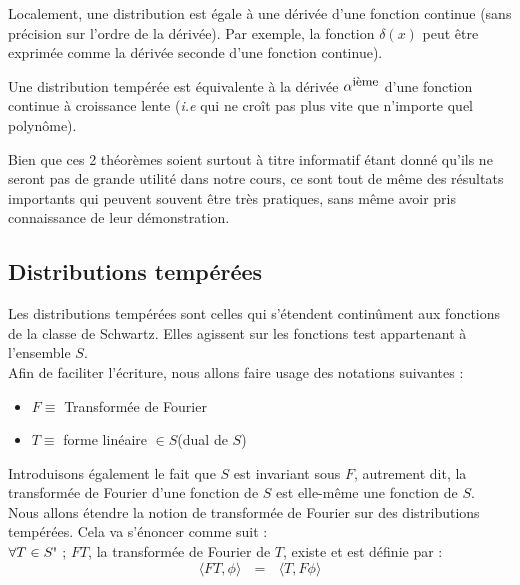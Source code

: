 \documentclass[../notesdecours.tex]{subfiles}
\begin{document}
\begin{theorem}
    Localement, une distribution est égale à une dérivée d'une fonction continue (sans précision sur l'ordre de la dérivée). Par exemple, la fonction $\delta(x)$ peut être exprimée comme la dérivée seconde d'une fonction continue).
\end{theorem}
\begin{theorem}
    Une distribution tempérée est équivalente à la dérivée $\alpha^{\mbox{\small{ième}}}$ d'une fonction continue à croissance lente (\textit{i.e} qui ne croît pas plus vite que n'importe quel polynôme).
\end{theorem}
Bien que ces 2 théorèmes soient surtout à titre informatif étant donné qu'ils ne seront pas de grande utilité dans notre cours, ce sont tout de même des résultats importants qui peuvent souvent être très pratiques, 
sans même avoir pris connaissance de leur démonstration.

\subsection{Distributions tempérées}
Les distributions tempérées sont celles qui s'étendent continûment aux fonctions de la classe de Schwartz. Elles agissent sur les fonctions test appartenant à l'ensemble $S$. \\
Afin de faciliter l'écriture, nous allons faire usage des notations suivantes : 
\begin{itemize}[label= \textbullet]
    \item $F \equiv$ Transformée de Fourier 
    \item $T \equiv$ forme linéaire $\in S$\textquotesingle  (dual de $S$) 
\end{itemize}
Introduisons également le fait que $S$ est invariant sous $F$, autrement dit, la transformée de Fourier d'une fonction de $S$ est elle-même une fonction de $S$. \\ 

Nous allons étendre la notion de transformée de Fourier sur des distributions tempérées. Cela va s'énoncer comme suit : \\
$\forall T \in S \mbox{\textquotesingle}$ ; $FT$, la transformée de Fourier de $T$, existe et est définie par :
\begin{equation}
\label{transformee de fourier de distribution}
    \langle FT, \phi\rangle  \mbox{ } = \mbox{ } \langle T, F\phi \rangle 
\end{equation}
\end{document}
